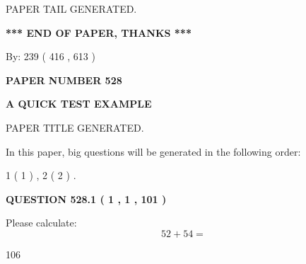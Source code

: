 \documentclass[12pt]{article}
\begin{document}
\vspace{2.0in} PAPER TAIL GENERATED.
   
   
   
   
\vspace{1.0in} 
{\textbf{\large{ *** END OF PAPER, THANKS *** }}} 
   
   
\hspace{1.0in} By: 
 239 ( 416 ,  613 )
   
   
   
   
\newpage 
\setcounter{page}{ 
   528001 } 
   
   
   
   
 {\textbf{ \Large{ PAPER NUMBER  528  }}}
   
   
\vspace{0.2in}
   
   
   
   
   
   
   
   
 \vspace{0.2in}
{\LARGE {\textbf{ A QUICK TEST EXAMPLE}}}
   
   
 PAPER TITLE GENERATED.
   
   
   
\vspace{0.2in}
   
In this paper, big questions will be generated in the following order: 
   
   
   1 ( 1 )
 ,
   2 ( 2 )
 .
  
\vspace{0.2in}
  
{\textbf{\Large{QUESTION
528.1 
 ( 1 , 1 , 101 )
}}}
  
  
 
Please calculate:
\begin{equation}
52 +  %
54 = \nonumber
\end{equation}
 
 
 
\noindent{}
 
 

106
 
 
\noindent{}
 
 

 
 
\end{document}
